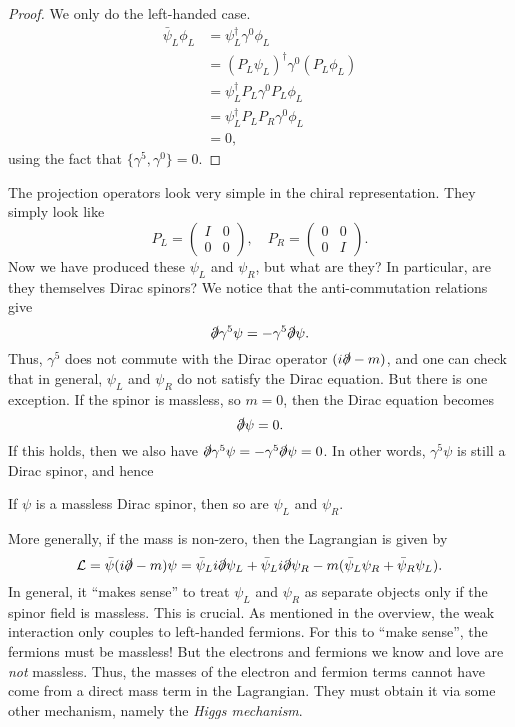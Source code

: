 \documentclass[a4paper]{article}
\begin{document}
\begin{proof}
  We only do the left-handed case.
  \begin{align*}
    \bar\psi_L \phi_L &= \psi_L^\dagger \gamma^0 \phi_L\\
    &= (P_L \psi_L)^\dagger \gamma^0 (P_L \phi_L)\\
    &= \psi_L^\dagger P_L \gamma^0 P_L \phi_L\\
    &= \psi_L^\dagger P_L P_R \gamma^0 \phi_L\\
    &= 0,
  \end{align*}
  using the fact that $\{\gamma^5, \gamma^0\} = 0$.
\end{proof}
The projection operators look very simple in the chiral representation. They simply look like
\[
  P_L =
  \begin{pmatrix}
    I & 0\\
    0 & 0
  \end{pmatrix},\quad
  P_R =
  \begin{pmatrix}
    0 & 0\\
    0 & I
  \end{pmatrix}.
\]
Now we have produced these $\psi_L$ and $\psi_R$, but what are they? In particular, are they themselves Dirac spinors? We notice that the anti-commutation relations give
\[
  \slashed \partial \gamma^5 \psi = -\gamma^5 \slashed \partial \psi.
\]
Thus, $\gamma^5$ does not commute with the Dirac operator $(i\slashed \partial - m)$, and one can check that in general, $\psi_L$ and $\psi_R$ do not satisfy the Dirac equation. But there is one exception. If the spinor is massless, so $m = 0$, then the Dirac equation becomes
\[
  \slashed \partial \psi = 0.
\]
If this holds, then we also have $\slashed \partial \gamma^5 \psi = - \gamma^5 \slashed \partial \psi = 0$. In other words, $\gamma^5 \psi$ is still a Dirac spinor, and hence
\begin{prop}
  If $\psi$ is a massless Dirac spinor, then so are $\psi_L$ and $\psi_R$.
\end{prop}
More generally, if the mass is non-zero, then the Lagrangian is given by
\[
  \mathcal{L} = \bar\psi (i \slashed{\partial} - m) \psi = \bar\psi_L i \slashed{\partial} \psi_L + \bar\psi_L i \slashed{\partial} \psi_R - m (\bar\psi_L \psi_R + \bar\psi_R \psi_L).
\]
In general, it ``makes sense'' to treat $\psi_L$ and $\psi_R$ as separate objects only if the spinor field is massless. This is crucial. As mentioned in the overview, the weak interaction only couples to left-handed fermions. For this to ``make sense'', the fermions must be massless! But the electrons and fermions we know and love are \emph{not} massless. Thus, the masses of the electron and fermion terms cannot have come from a direct mass term in the Lagrangian. They must obtain it via some other mechanism, namely the \emph{Higgs mechanism}.
\end{document}
